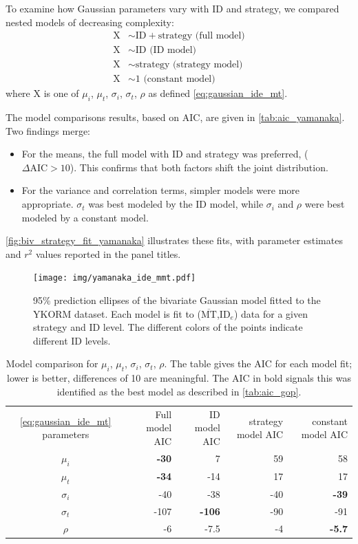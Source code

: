 \documentclass[acmlarge, manuscript,review]{acmart}
\newcommand{\mmt}{\ensuremath{\overline{\mt}}\xspace}
\newcommand{\mt}{\ensuremath{{\text{MT}}}\xspace}
\newcommand{\ide}{\ensuremath{{\text{ID}_e}}\xspace}
\begin{document}
To examine how Gaussian parameters vary with ID and strategy, we compared nested models of decreasing complexity:
\begin{align}
	\text{X} & \sim \text{ID} + \text{strategy (full model)}  \\
	\text{X} &\sim \text{ID (ID model)} \\
	\text{X} &\sim \text{strategy (strategy model)} \\
	\text{X} &\sim 1 \text{ (constant model)} 
\end{align}
where X is one of $\mu_i$, $\mu_t$, $\sigma_i$, $\sigma_t$, $\rho$ as defined \autoref{eq:gaussian_ide_mt}. 


The model comparisons results, based on AIC, are given in \autoref{tab:aic_yamanaka}. Two findings merge:
\begin{itemize}
	\item For the means, the full model with ID and strategy was preferred, ($\Delta\text{AIC} > 10$). This confirms that both factors shift the joint distribution.
	\item For the variance and correlation terms, simpler models were more appropriate. $\sigma_t$ was best modeled by the ID model, while $\sigma_i$ and $\rho$ were best modeled by a constant model.
\end{itemize}

\autoref{fig:biv_strategy_fit_yamanaka} illustrates these fits, with parameter estimates and $r^2$ values reported in the panel titles.


\begin{figure}[htbp]
	\centering
	\texttt{[image: img/yamanaka\_ide\_mmt.pdf]}
	\caption{95\% prediction ellipses of the bivariate Gaussian model fitted to the YKORM dataset. Each model is fit to (\mmt,\ide) data for a given strategy and ID level. The different colors of the points indicate different ID levels.}
	\label{fig:yamanaka_ide_mmt}
\end{figure}

\begin{table}[htbp]
	\centering
	\caption{Model comparison for $\mu_i$, $\mu_t$, $\sigma_i$, $\sigma_t$, $\rho$. The table gives the AIC for each model fit; lower is better, differences of 10 are meaningful. The AIC in bold signals this was identified as the best model as described in \autoref{tab:aic_gop}.}
	\label{tab:aic_yamanaka}
	\begin{tabular}{c rrrr}
	\autoref{eq:gaussian_ide_mt} parameters	& Full model AIC & ID model AIC& strategy model AIC& constant model AIC\\
	$\mu_i$ & \textbf{-30} & 7 & 59 & 58 \\
	$\mu_t$ & \textbf{-34} & -14  & 17 & 17 \\
	$\sigma_i$ & -40 & -38 & -40 & \textbf{-39} \\
	$\sigma_t$ & -107 & \textbf{-106} & -90 & -91 \\
	$\rho$ & -6 & -7.5& -4& \textbf{-5.7} \\
	\end{tabular}
\end{table}
\end{document}
